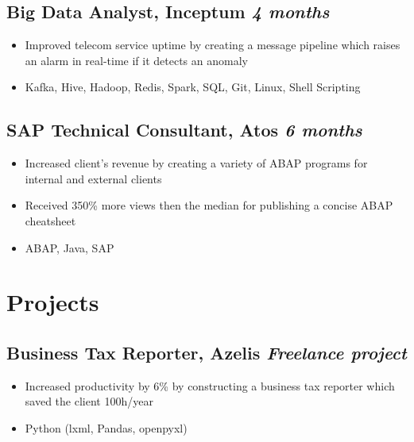\documentclass[a4paper]{article}
\newcommand{\bolditalicpair}
[2]
{\textbf{#1} \texorpdfstring{\hfill}{} \textit{#2}}
\begin{document}
\subsection{\bolditalicpair{Big Data Analyst, Inceptum}{4 months}}

\begin{itemize}
  \item Improved telecom service uptime by creating a message pipeline which raises an alarm in real-time if it detects an anomaly
  \item Kafka, Hive, Hadoop, Redis, Spark, SQL, Git, Linux, Shell Scripting
\end{itemize}

\subsection{\bolditalicpair{SAP Technical Consultant, Atos}{6 months}}

\begin{itemize}
  \item Increased client's revenue by creating a variety of ABAP programs for internal and external clients
  \item Received 350\% more views then the median for publishing a concise ABAP cheatsheet
  \item ABAP, Java, SAP
\end{itemize}



\section{Projects}
\subsection{\bolditalicpair{Business Tax Reporter, Azelis}{Freelance project}}

\begin{itemize}
  \item Increased productivity by 6\% by constructing a business tax reporter which saved the client 100h/year
  \item Python (lxml, Pandas, openpyxl)
\end{itemize}

\end{document}
